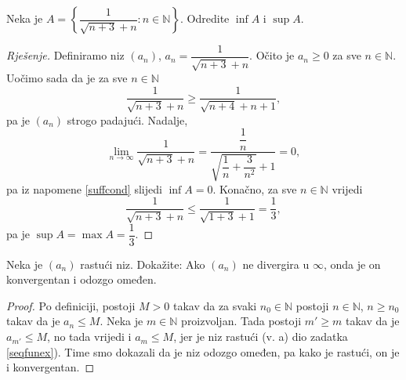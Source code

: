 \begin{exercise}
Neka je $A=\left\{\dfrac{1}{\sqrt{n+3}+n} : n\in \mathbb{N}\right\}$. Odredite $\inf{A}$ i $\sup{A}$.
\end{exercise}
\begin{proof}[Rješenje]
Definiramo niz $(a_n)$, $a_n=\dfrac{1}{\sqrt{n+3}+n}$. Očito je $a_n\geq 0$ za sve $n\in \mathbb{N}$. Uočimo sada da je za sve $n\in \mathbb{N}$
$$\dfrac{1}{\sqrt{n+3}+n}\geq \dfrac{1}{\sqrt{n+4}+n+1},$$
pa je $(a_n)$ strogo padajući. Nadalje,
$$\lim\limits_{n\to \infty}{\dfrac{1}{\sqrt{n+3}+n}}=\dfrac{\dfrac{1}{n}}{\sqrt{\dfrac{1}{n}+\dfrac{3}{n^2}}+1}=0,$$
pa iz napomene \ref{suffcond} slijedi $\inf{A}=0$. Konačno, za sve $n\in \mathbb{N}$ vrijedi
$$\dfrac{1}{\sqrt{n+3}+n}\leq \dfrac{1}{\sqrt{1+3}+1}=\dfrac{1}{3},$$
pa je $\sup{A}=\max{A}=\dfrac{1}{3}$.
\end{proof}
\begin{exercise}
Neka je $(a_n)$ rastući niz. Dokažite: Ako $(a_n)$ ne divergira u $\infty$, onda je on konvergentan i odozgo omeđen.
\end{exercise}
\begin{proof}
Po definiciji, postoji $M>0$ takav da za svaki $n_0\in \mathbb{N}$ postoji $n\in \mathbb{N}$, $n\geq n_0$ takav da je $a_n\leq M$. Neka je $m\in \mathbb{N}$ proizvoljan. Tada postoji $m'\geq m$ takav da je $a_{m'}\leq M$, no tada vrijedi i $a_m\leq M$, jer je niz rastući (v. a) dio zadatka \ref{seqfunex}). Time smo dokazali da je niz odozgo omeđen, pa kako je rastući, on je i konvergentan.
\end{proof}
